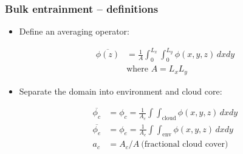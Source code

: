 \documentclass[fleqn,hyperref={colorlinks=true,linkcolor=blue,urlcolor=blue},numbers]{beamer}
\begin{document}
\begin{frame}
  \frametitle{Bulk entrainment -- definitions}

  \begin{itemize}
  \item Define an averaging operator:

\begin{equation*}
  \label{eq:average}
  \begin{split}
  \overline{\phi(z)} &= \frac{1 }{A}\int_{ 0}^{L_x} \int_{ 0}^{L_y} \phi(x,y,z) \!\,dx dy \\
&\text{where\ \ }  A =L_x L_y
  \end{split}
\end{equation*} \pause


\item Separate the domain into environment and cloud core:


\begin{equation*}
  \label{eq:cloudy}
  \begin{split}
  \overline{\phi_c} &= \phi_c = \frac{1 }{A_c}\int \int_{\text{cloud}} \phi(x,y,z) \!\,dx dy \\
  \overline{\phi_e} &= \phi_e = \frac{1 }{A_e} \int \int_{\text{env}} \phi(x,y,z) \!\,dx dy \\
a_c &= A_c/A\ \text{(fractional cloud cover)}
  \end{split}
\end{equation*}

\end{itemize}
\end{frame}
\end{document}
